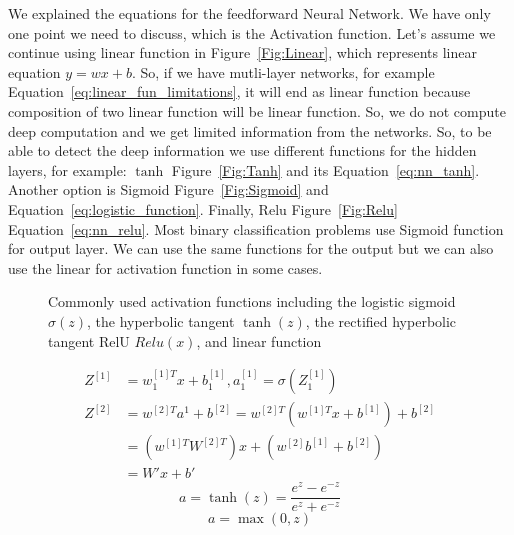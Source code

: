 We explained the equations for the feedforward Neural Network. We have only one point we need to discuss, which is the Activation function. Let's assume we continue using linear function in Figure~\ref{Fig:Linear}, which represents linear equation  $y= w x + b$. So, if we have mutli-layer networks, for example Equation~\eqref{eq:linear_fun_limitations}, it will end as linear function because composition of two linear function will be linear function. So, we do not compute deep computation and we get limited information from the networks. So, to be able to detect the deep information we use different functions for the hidden layers, for example: $\tanh$ Figure~\ref{Fig:Tanh} and its Equation~\eqref{eq:nn_tanh}. Another option is Sigmoid Figure~\ref{Fig:Sigmoid} and  Equation~\eqref{eq:logistic_function}. Finally, Relu Figure~\ref{Fig:Relu} Equation~\eqref{eq:nn_relu}. Most binary classification problems use Sigmoid function for output layer. We can use the same functions for the output but we can also use the linear for activation function in some cases.%
\begin{figure}[!t]
 \centering
%
% 
%
 \caption{Commonly used activation functions including the logistic sigmoid $\sigma(z)$, the hyperbolic tangent $\tanh(z)$, the rectified hyperbolic tangent RelU $Relu(x)$, and linear function}
\end{figure}%
\begin{subequations}\label{eq:linear_fun_limitations}
  \begin{align}
   Z^{[1]} & = w_1^{[1]T} x + b_1^{[1]} , a_1^{[1]} = \sigma(Z_1^{[1]}) \\
   Z^{[2]} & = w^{[2]T} a^1 + b^{[2]} = w^{[2]T} (w^{[1]T}x + b^{[1]}) + b^{[2]}\\
   & = (w^{[1]T}W^{[2]T})x + (w^{[2]}b^{[1]}+ b^{[2]})\\
   & = W' x + b'
\end{align}
\end{subequations}%
\begin{equation}\label{eq:nn_tanh}
 a = \tanh(z) =\frac{e^z-e^{-z}}{e^z+e^{-z}}
\end{equation}%
\begin{equation}\label{eq:nn_relu}
 a = \max(0,z)
\end{equation}%
%

